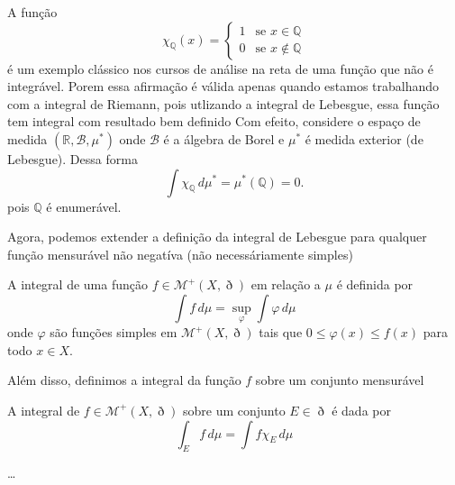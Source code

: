 \documentclass[a4paper, 11pt]{book}
\theoremstyle{definition}
\newcommand{\bQ}{\mathbb{Q}}
\newcommand{\bR}{\mathbb{R}}
\newcommand{\cB}{\mathcal{B}}
\newcommand{\cM}{\mathcal{M}}
\begin{document}
\begin{ex}
    A função
    \[
        \chi_{\bQ}(x) = 
        \left\{  
            \begin{array}{ll}
                1 &\text{se } x \in \bQ\\
                0 &\text{se } x \not\in \bQ
            \end{array}
        \right.
    \]
    é um exemplo clássico nos cursos de análise na reta de uma função que não é integrável. 
    Porem essa afirmação é válida apenas quando estamos trabalhando com a integral de Riemann, pois utlizando a integral de Lebesgue, essa função tem integral com resultado bem definido
    Com efeito, considere o espaço de medida $(\bR, \cB, \mu^*)$ onde $\cB$ é a álgebra de Borel e $\mu^*$ é medida exterior (de Lebesgue).
    Dessa forma
    \[
        \int \chi_\bQ \,d\mu^* = \mu^*(\bQ) = 0.
    \]
    pois $\bQ$ é enumerável.
\end{ex}

Agora, podemos extender a definição da integral de Lebesgue para qualquer função mensurável não negatíva (não necessáriamente simples)

\begin{dbox}
    A integral de uma função $f \in \cM^+(X,\eth)$ em relação a $\mu$ é definida por
    \[
        \int f \, d\mu = \sup_\varphi \int \varphi \, d\mu
    \]
    onde $\varphi$ são funções simples em $\mathcal{M}^+(X,\eth)$ tais que $0 \leqslant \varphi(x) \leqslant f(x)$ para todo $x \in X$.
\end{dbox}

Além disso, definimos a integral da função $f$ sobre um conjunto mensurável

\begin{dbox}
    A integral de $f \in \cM^+(X,\eth)$ sobre um conjunto $E \in \eth$ é dada por
    \[
        \int_E f \, d\mu = \int f \chi_E \, d\mu
    \]
\end{dbox}

\dots
\end{document}
